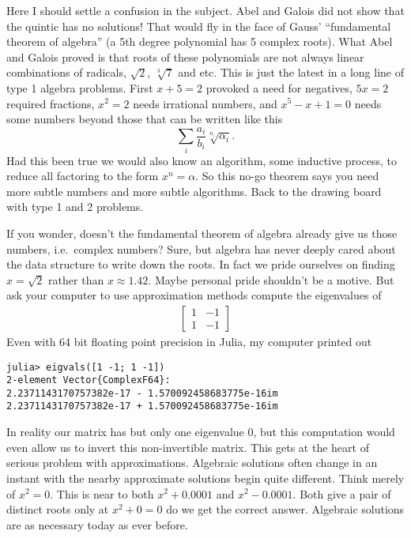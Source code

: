 Here I should settle a confusion in the subject.  Abel and Galois did 
not show that the quintic has no solutions!  That would fly in the 
face of  Gauss' ``fundamental theorem 
of algebra'' (a 5th degree polynomial has 5 complex roots).  
What Abel and Galois proved is that roots of these polynomials 
are not always linear combinations of radicals, $\sqrt{2}$, $\sqrt[3]{7}$ and 
etc.  This is just the latest in a long line of type 1 algebra problems.  First 
$x+5=2$ provoked a need for negatives, $5x=2$ required fractions, $x^2=2$ 
needs irrational numbers, and $x^5-x+1=0$ needs some numbers beyond 
those that can be written like this
\[
    \sum_i \frac{a_i}{b_i}\sqrt[n_i]{\alpha_i}.
\]
Had this been true we would also know an algorithm, some inductive process, 
to reduce all factoring to the form $x^n=\alpha$.  So this no-go theorem 
says you need more subtle numbers and more subtle algorithms. Back to the 
drawing board with type 1 and 2 problems.

If you wonder, doesn't the fundamental theorem of algebra already 
give us those numbers, i.e.\ complex numbers?  Sure, but algebra has never 
deeply cared about the data structure to write down the roots.  In fact we 
pride ourselves on finding $x=\sqrt{2}$ rather than $x\approx 1.42$.
Maybe personal pride shouldn't be a motive.  But ask your computer to 
use approximation methods 
compute the eigenvalues of 
\begin{align*}
    \begin{bmatrix}
        1 & -1 \\
        1 & -1
    \end{bmatrix}
\end{align*}
Even with 64 bit floating point precision in Julia, my computer printed out 
\begin{lstlisting}
julia> eigvals([1 -1; 1 -1])
2-element Vector{ComplexF64}:
2.2371143170757382e-17 - 1.570092458683775e-16im
2.2371143170757382e-17 + 1.570092458683775e-16im      
\end{lstlisting}
In reality our matrix has but only one eigenvalue $0$, but this computation would 
even allow us to invert this non-invertible matrix.  This gets at the heart of 
serious problem with approximations.  Algebraic solutions often change in an instant
with the nearby approximate solutions begin quite different.  Think 
merely of $x^2=0$.  This is near to both $x^2+0.0001$ and $x^2-0.0001$.  Both give 
a pair of distinct roots only at $x^2+0=0$ do we get the correct answer.
Algebraic solutions are as necessary today as ever before.





